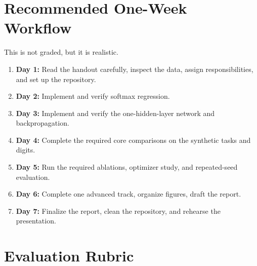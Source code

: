 \documentclass[11pt]{article}
\begin{document}
\section{Recommended One-Week Workflow}

This is not graded, but it is realistic.

\begin{enumerate}
    \item \textbf{Day 1:} Read the handout carefully, inspect the data, assign responsibilities, and set up the repository.
    \item \textbf{Day 2:} Implement and verify softmax regression.
    \item \textbf{Day 3:} Implement and verify the one-hidden-layer network and backpropagation.
    \item \textbf{Day 4:} Complete the required core comparisons on the synthetic tasks and digits.
    \item \textbf{Day 5:} Run the required ablations, optimizer study, and repeated-seed evaluation.
    \item \textbf{Day 6:} Complete one advanced track, organize figures, draft the report.
    \item \textbf{Day 7:} Finalize the report, clean the repository, and rehearse the presentation.
\end{enumerate}

\section{Evaluation Rubric}
\end{document}
